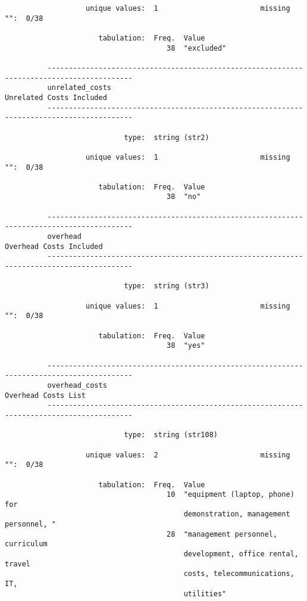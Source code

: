 \documentclass{article}
\begin{document}
\begin{verbatim}
                   unique values:  1                        missing "":  0/38
          
                      tabulation:  Freq.  Value
                                      38  "excluded"
          
          ------------------------------------------------------------------------------------------
          unrelated_costs                                                   Unrelated Costs Included
          ------------------------------------------------------------------------------------------
          
                            type:  string (str2)
          
                   unique values:  1                        missing "":  0/38
          
                      tabulation:  Freq.  Value
                                      38  "no"
          
          ------------------------------------------------------------------------------------------
          overhead                                                           Overhead Costs Included
          ------------------------------------------------------------------------------------------
          
                            type:  string (str3)
          
                   unique values:  1                        missing "":  0/38
          
                      tabulation:  Freq.  Value
                                      38  "yes"
          
          ------------------------------------------------------------------------------------------
          overhead_costs                                                         Overhead Costs List
          ------------------------------------------------------------------------------------------
          
                            type:  string (str108)
          
                   unique values:  2                        missing "":  0/38
          
                      tabulation:  Freq.  Value
                                      10  "equipment (laptop, phone) for
                                          demonstration, management personnel, "
                                      28  "management personnel, curriculum
                                          development, office rental, travel
                                          costs, telecommunications, IT,
                                          utilities"
          

\end{verbatim}
\end{document}
